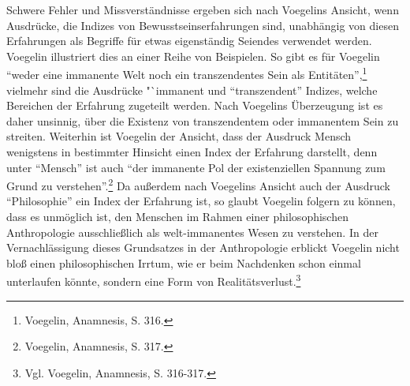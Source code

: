 Schwere Fehler und Missverständnisse ergeben sich nach Voegelins Ansicht, wenn
Ausdrücke, die Indizes von Bewusstseinserfahrungen sind, unabhängig von diesen
Erfahrungen als Begriffe für etwas eigenständig Seiendes verwendet werden.
Voegelin illustriert dies an einer Reihe von Beispielen. So gibt es für
Voegelin "`weder eine immanente Welt noch ein transzendentes Sein als
Entitäten"',\footnote{Voegelin, Anamnesis, S. 316.} vielmehr sind die Ausdrücke
"`immanent und "`transzendent"' Indizes, welche Bereichen der Erfahrung
zugeteilt werden. Nach Voegelins Überzeugung ist es daher unsinnig, über die
Existenz von transzendentem oder immanentem Sein zu streiten. Weiterhin ist
Voegelin der Ansicht, dass der Ausdruck Mensch wenigstens in bestimmter
Hinsicht einen Index der Erfahrung darstellt, denn unter "`Mensch"' ist auch
"`der immanente Pol der existenziellen Spannung zum Grund zu
verstehen"'.\footnote{Voegelin, Anamnesis, S. 317.} Da außerdem nach Voegelins
Ansicht auch der Ausdruck "`Philosophie"' ein Index der Erfahrung ist, so
glaubt Voegelin folgern zu können, dass es unmöglich ist, den Menschen im
Rahmen einer philosophischen Anthropologie ausschließlich als welt-immanentes
Wesen zu verstehen. In der Vernachlässigung dieses Grundsatzes in der
Anthropologie erblickt Voegelin nicht bloß einen philosophischen
Irrtum, wie er beim Nachdenken schon einmal unterlaufen könnte, sondern eine
Form von Realitätsverlust.\footnote{Vgl. Voegelin, Anamnesis, S. 316-317.}

